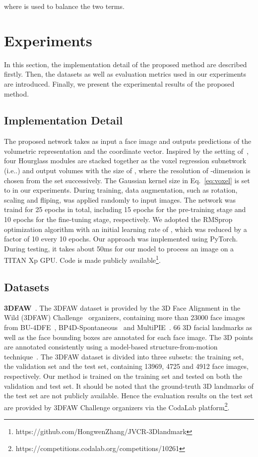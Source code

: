 \documentclass[a4paper,conference]{IEEEtran}
\makeatletter
\DeclareRobustCommand\onedot{\futurelet\@let@token\@onedot}
\def\@onedot{\ifx\@let@token.\else.\null\fi\xspace}
\def\ie{{i.e}\onedot} \def\Ie{{I.e}\onedot}
\makeatother
\begin{document}
where  is used to balance the two terms.

\section{Experiments}
\label{Experiments}

In this section, the implementation detail of the proposed method are described firstly.
Then, the datasets as well as evaluation metrics used in our experiments are introduced.
Finally, we present the experimental results of the proposed method.


\subsection{Implementation Detail}
The proposed network takes as input a  face image and outputs predictions of the volumetric representation and the coordinate vector.
Inspired by the setting of~\cite{newell2016stacked}, four Hourglass modules are stacked together as the voxel regression subnetwork (\ie ) and output volumes with the size of , where the resolution  of -dimension is chosen from the set  successively. 
The Gaussian kernel size in Eq.~\ref{eq:voxel} is set to  in our experiments.
During training, data augmentation, such as rotation, scaling and fliping, was applied randomly to input images.
The network was traind for 25 epochs in total, including 15 epochs for the pre-training stage and 10 epochs for the fine-tuning stage, respectively.
We adopted the RMSprop~\cite{tieleman2012lecture} optimization algorithm with an initial learning rate of , which was reduced by a factor of 10 every 10 epochs.
Our approach was implemented using PyTorch. During testing, it takes about 50ms for our model to process an image on a TITAN Xp GPU.
Code is made publicly available\footnote{https://github.com/HongwenZhang/JVCR-3Dlandmark}.


\subsection{Datasets}


\textbf{3DFAW}~\cite{jeni2016first}. The 3DFAW dataset is provided by the 3D Face Alignment in the Wild (3DFAW) Challenge~\cite{jeni2016first} organizers, containing more than 23000 face images from BU-4DFE~\cite{yin2008high}, BP4D-Spontaneous~\cite{zhang2014bp4d} and MultiPIE~\cite{gross2010multi}. 
66 3D facial landmarks as well as the face bounding boxes are annotated for each face image.
The 3D points are annotated consistently using a model-based structure-from-motion technique~\cite{jeni2017dense}.
The 3DFAW dataset is divided into three subsets: the training set, the validation set and the test set, containing 13969, 4725 and 4912 face images, respectively.
Our method is trained on the training set and tested on both the validation and test set. 
It should be noted that the ground-truth 3D landmarks of the test set are not publicly available.
Hence the evaluation results on the test set are provided by 3DFAW Challenge organizers via the CodaLab platform\footnote{https://competitions.codalab.org/competitions/10261}.
\end{document}

